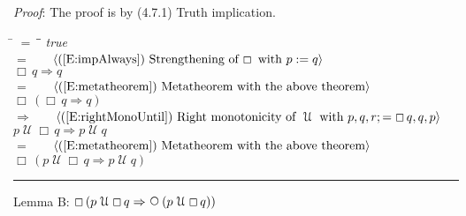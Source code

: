 \documentclass[12pt, fleqn, leqno]{article}
\newcommand{\lgap}{2pt}                             %
\newcommand{\mymathindent}{24pt}                    %
\newcommand{\impl}{\ensuremath{\Rightarrow}}        %
\newcommand{\Until}{\;\mathcal{U}\;}
\newcommand{\Next}{\;\,\text{\raisebox{3.5pt}{\circle{6}}}}
\newcommand{\Always}{\Box\,}
\newcommand{\myqed}{\rule[-.23ex]{1.2ex}{2.0ex}}
\newcommand{\myqedtab}{\hspace{384pt}}              %
\newcommand{\Gll} {\langle}                         %
\newcommand{\Ggg} {\rangle}                         %
\newcommand{\Hint}[1]     {\ \ \ $\Gll              \mbox{#1} \Ggg$ }   %
\begin{document}
{\emph{Proof}: The proof is by (4.7.1) Truth implication.
\begin{tabbing}
\hspace{\mymathindent} \= $= \;$ \= \myqedtab \= \kill
  \> \>   \textit{true}\\[\lgap]
  \> $=$ \> \Hint{(\ref{E:impAlways}) Strengthening of $\Always$ with $p:=q$} \\[\lgap]
  \> \>   $\Always q \impl q$\\[\lgap]
   \> $=$ \> \Hint{(\ref{E:metatheorem}) Metatheorem with the above theorem}\\[\lgap]
    \> \>   $\Always (\Always q \impl q)$\\[\lgap]
     \> $\impl$  \>  \Hint{(\ref{E:rightMonoUntil}) Right monotonicity of $\Until$ with $p,q,r ;= \Always q, q, p$}\\[\lgap]
   \> \>   $p \Until \Always q \impl p \Until q$\\[\lgap]
   \> $=$ \> \Hint{(\ref{E:metatheorem}) Metatheorem with the above theorem}\\[\lgap]
   \> \>   $\Always (p \Until \Always q \impl p \Until q)$ \quad \myqed
\end{tabbing}
Lemma B: $\Always (p \Until \Always q \impl \Next (p \Until \Always q))$

}
\end{document}
